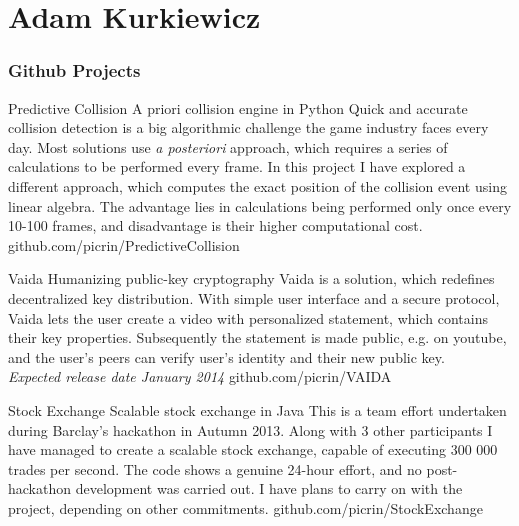 \documentclass{tccv}
\begin{document}
\setlength{\emergencystretch}{3em}
\part{Adam Kurkiewicz}

\section{Github Projects}


\begin{eventlist}

\item{Predictive Collision}
     {A priori collision engine in Python}
     {Quick and accurate collision detection is a big algorithmic challenge the game industry faces every day. Most solutions use \textit{a posteriori} approach, which requires a series of calculations to be performed every frame. In this project I have explored a different approach, which computes the exact position of the collision event using linear algebra. The advantage lies in calculations being performed only once every 10-100 frames, and disadvantage is their higher computational cost.}
     {github.com/picrin/PredictiveCollision}

\item{Vaida}
     {Humanizing public-key cryptography}
     {Vaida is a solution, which redefines decentralized key distribution. With simple user interface and a secure protocol, Vaida lets the user create a video with personalized statement, which contains their key properties. Subsequently the statement is made public, e.g. on youtube, and the user's peers can verify user's identity and their new public key.\\\it Expected release date January 2014}
     {github.com/picrin/VAIDA}

\item{Stock Exchange}
     {Scalable stock exchange in Java}
     {This is a team effort undertaken during Barclay's hackathon in Autumn 2013. Along with 3 other participants I have managed to create a scalable stock exchange, capable of executing 300 000 trades per second. The code shows a genuine 24-hour effort, and no post-hackathon development was carried out. I have plans to carry on with the project, depending on other commitments.}
     {github.com/picrin/StockExchange}


\end{eventlist}
\end{document}
